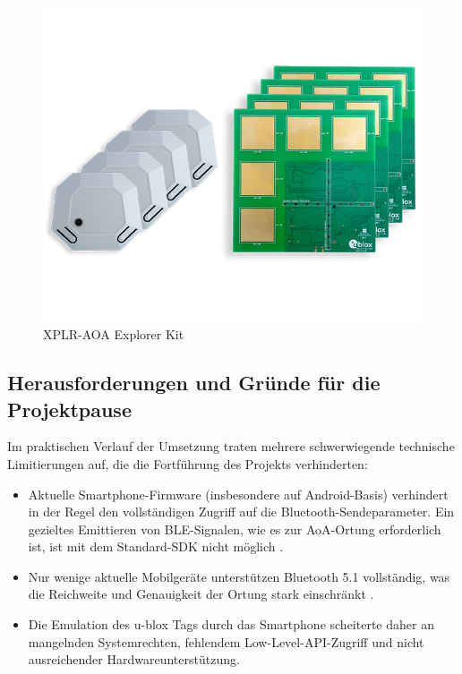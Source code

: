 \documentclass[a4paper, 12pt]{article} %
\begin{document}
\begin{figure}[H]
    \centering
    \includegraphics[width=1\linewidth]{images/XPLR-AOA-with-C209-and-C211-02_0}
    \caption{XPLR-AOA Explorer Kit}
    \label{ABBILDUNG}
\end{figure}

\subsection{Herausforderungen und Gründe für die Projektpause}
Im praktischen Verlauf der Umsetzung traten mehrere schwerwiegende technische Limitierungen auf, die die Fortführung des Projekts verhinderten:

\begin{itemize}
    \item Aktuelle Smartphone-Firmware (insbesondere auf Android-Basis) verhindert in der Regel den vollständigen Zugriff auf die Bluetooth-Sendeparameter. Ein gezieltes Emittieren von \acf{BLE}-Signalen, wie es zur \ac{AoA}-Ortung erforderlich ist, ist mit dem Standard-\acf{SDK} nicht möglich \cite{androidBLElimitation}.
    \item Nur wenige aktuelle Mobilgeräte unterstützen Bluetooth 5.1 vollständig, was die Reichweite und Genauigkeit der Ortung stark einschränkt \cite{ble51market2023}.
    \item Die Emulation des u-blox Tags durch das Smartphone scheiterte daher an mangelnden Systemrechten, fehlendem Low-Level-\acf{API}-Zugriff und nicht ausreichender Hardwareunterstützung.
\end{itemize}
\end{document}
